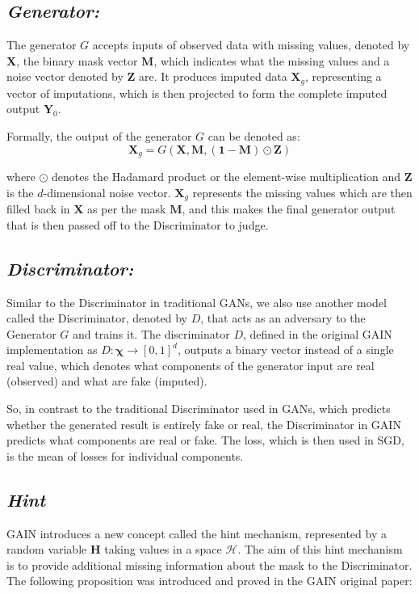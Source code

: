 \subsection{\textit{Generator:}}

The generator \( G \) accepts inputs of observed data with missing values, denoted by \( \mathbf{X} \), the binary mask vector \( \mathbf{M} \), which indicates what the missing values and a noise vector denoted by \( \mathbf{Z} \) are. It produces imputed data \( \mathbf{X}_g \), representing a vector of imputations, which is then projected to form the complete imputed output \( \mathbf{Y}_0 \). 

Formally, the output of the generator \( G \) can be denoted as: 
\[ \mathbf{X}_g = G(\mathbf{X}, \mathbf{M}, (\mathbf{1}-\mathbf{M}) \odot \mathbf{Z}) \]

where \( \odot \) denotes the Hadamard product or the element-wise multiplication and \( \mathbf{Z} \) is the \( d \)-dimensional noise vector. \( \mathbf{X}_g \) represents the missing values which are then filled back in \( \mathbf{X} \) as per the mask \( \mathbf{M} \), and this makes the final generator output that is then passed off to the Discriminator to judge.

\subsection{\textit{Discriminator:}}

Similar to the Discriminator in traditional GANs, we also use another model called the Discriminator, denoted by \( D \), that acts as an adversary to the Generator \( G \) and trains it. The discriminator \( D \), defined in the original GAIN implementation as \( D: \mathbf{\chi} \rightarrow [0,1]^d \), outputs a binary vector instead of a single real value, which denotes what components of the generator input are real (observed) and what are fake (imputed). 

So, in contrast to the traditional Discriminator used in GANs, which predicts whether the generated result is entirely fake or real, the Discriminator in GAIN predicts what components are real or fake. The loss, which is then used in SGD, is the mean of losses for individual components.

\subsection{\textit{Hint}}
GAIN introduces a new concept called the hint mechanism, represented by a random variable \( \mathbf{H} \) taking values in a space \( \mathcal{H} \). The aim of this hint mechanism is to provide additional missing information about the mask to the Discriminator. The following proposition was introduced and proved in the GAIN\cite{gain} original paper:

